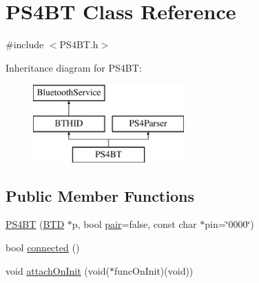 \hypertarget{class_p_s4_b_t}{\section{\-P\-S4\-B\-T \-Class \-Reference}
\label{class_p_s4_b_t}
}


{\ttfamily \#include $<$\-P\-S4\-B\-T.\-h$>$}

\-Inheritance diagram for \-P\-S4\-B\-T\-:\begin{figure}[H]
\begin{center}
\leavevmode
\includegraphics[height=3.000000cm]{class_p_s4_b_t}
\end{center}
\end{figure}
\subsection*{\-Public \-Member \-Functions}
\begin{DoxyCompactItemize}
\item 
\hyperlink{class_p_s4_b_t_a616d5167f795b14c5955910807b5024b}{\-P\-S4\-B\-T} (\hyperlink{class_b_t_d}{\-B\-T\-D} $\ast$p, bool \hyperlink{class_b_t_h_i_d_afb19720b65cda69d910416c7a689dd45}{pair}=false, const char $\ast$pin=\char`\"{}0000\char`\"{})
\item 
bool \hyperlink{class_p_s4_b_t_a08a857b8533e59f6eb872e4c8f727405}{connected} ()
\item 
void \hyperlink{class_p_s4_b_t_a63c57ecc5c678da13e7787792e385ec9}{attach\-On\-Init} (void($\ast$func\-On\-Init)(void))
\end{DoxyCompactItemize}
